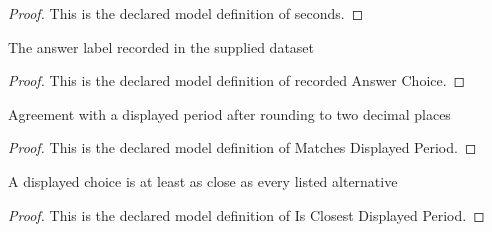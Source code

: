 \begin{proof}
  This is the declared model definition of seconds.
\end{proof}
\begin{definition}
  \label{def:physics:phyx-mini-0263:phyxminiproblems-problemphyxmini0263-recordedanswerchoice}
  The answer label recorded in the supplied dataset
\end{definition}
\begin{proof}
  This is the declared model definition of recorded Answer Choice.
\end{proof}
\begin{definition}
  \label{def:physics:phyx-mini-0263:phyxminiproblems-problemphyxmini0263-matchesdisplayedperiod}
  Agreement with a displayed period after rounding to two decimal places
\end{definition}
\begin{proof}
  This is the declared model definition of Matches Displayed Period.
\end{proof}
\begin{definition}
  \label{def:physics:phyx-mini-0263:phyxminiproblems-problemphyxmini0263-isclosestdisplayedperiod}
  A displayed choice is at least as close as every listed alternative
\end{definition}
\begin{proof}
  This is the declared model definition of Is Closest Displayed Period.
\end{proof}
